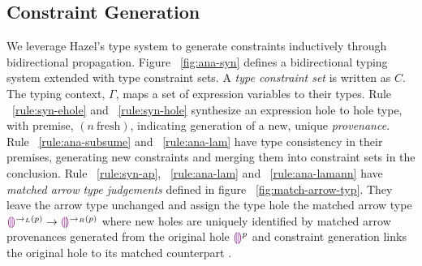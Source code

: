 \subsection{Constraint Generation}
We leverage Hazel's type system to generate constraints inductively through bidirectional propagation. Figure ~\ref{fig:ana-syn} defines a bidirectional typing system extended with type constraint sets. A \emph{type constraint set} is written as $C$. The typing context, $\Gamma$, maps a set of expression variables to their types. Rule ~\ref{rule:syn-ehole} and ~\ref{rule:syn-hole} synthesize an expression hole to hole type, with premise, $(n ~ \text{fresh})$, indicating generation of a new, unique \emph{provenance}. Rule ~\ref{rule:ana-subsume} and ~\ref{rule:ana-lam} have type consistency in their premises, generating new constraints and merging them into constraint sets in the conclusion. Rule ~\ref{rule:syn-ap}, ~\ref{rule:ana-lam} and ~\ref{rule:ana-lamann} have \emph{matched arrow type judgements} defined in figure ~\ref{fig:match-arrow-typ}. They leave the arrow type unchanged and assign the type hole the matched arrow type $\textcolor{violet}{\llparenthesis}\textcolor{violet}{\rrparenthesis}^{\rightarrow_{L}(p)} \rightarrow \textcolor{violet}{\llparenthesis}\textcolor{violet}{\rrparenthesis}^{\rightarrow_{R}(p)}$ where new holes are uniquely identified by matched arrow provenances generated from the original hole $\textcolor{violet}{\llparenthesis}\textcolor{violet}{\rrparenthesis}^{p}$ and constraint generation links the original hole to its matched counterpart \cite{HazelnutPOPL}.


